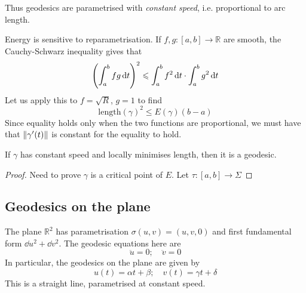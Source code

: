 \documentclass[a4paper]{article}
\begin{document}
Thus geodesics are parametrised with \textit{constant speed}, i.e. proportional to arc length. 

Energy is sensitive to reparametrisation.
If \( f, g \colon [a,b] \to \mathbb R \) are smooth, the Cauchy-Schwarz inequality gives that
\[
	\qty(\int_a^b fg \dd{t})^2 \leqslant \int_a^b f^2 \dd{t} \cdot \int_a^b g^2 \dd{t}
\]
Let us apply this to \( f = \sqrt{R} \), \( g = 1 \) to find
\[
	\mathrm{length}(\gamma)^2 \leq E(\gamma)(b-a)
\]
Since equality holds only when the two functions are proportional, we must have that \( \norm{\gamma'(t)} \) is constant for the equality to hold.

\begin{corollary}
	If \( \gamma \) has constant speed and locally minimises length, then it is a geodesic.
\end{corollary}
\begin{proof}
	Need to prove $ \gamma $ is a critical point of $E$. Let $ \tau: [a,b]\to \Sigma $
\end{proof}

\subsection{Geodesics on the plane}
The plane \( \mathbb R^2 \) has parametrisation \( \sigma(u,v) = (u,v,0) \) and first fundamental form \( \dd{u}^2 + \dd{v}^2 \).
The geodesic equations here are
\[
	\ddot u = 0;\quad \ddot v = 0
\]
In particular, the geodesics on the plane are given by
\[
	u(t) = \alpha t + \beta;\quad v(t) = \gamma t + \delta
\]
This is a straight line, parametrised at constant speed.
\end{document}
